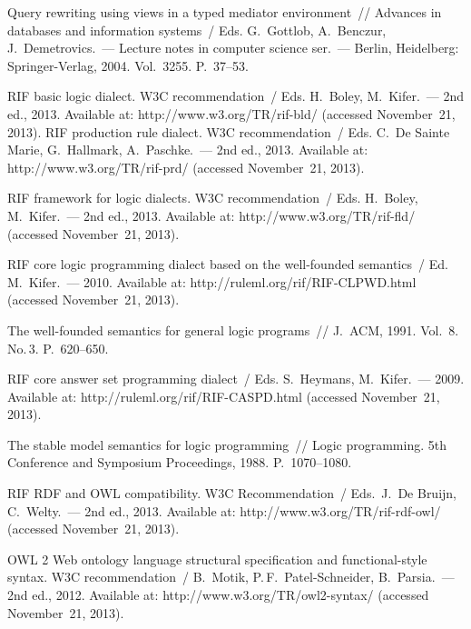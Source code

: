 \begin{multicols}{2}
{{\begin{thebibliography}{99}
 Query rewriting using views
in a typed mediator environment~// {Advances in databases and information
systems}~/ Eds. G.~Gottlob, A.~Benczur, J.~Demetrovics.~--- Lecture notes in
computer science ser.~--- Berlin, Heidelberg: Springer-Verlag, 2004. Vol.~3255.
P.~37--53.

RIF basic logic dialect. W3C recommendation~/
Eds. H.~Boley, M.~Kifer.~--- 2nd ed., 2013.  Available at: {\sf http://www.w3.org/TR/rif-bld/}
(accessed November~21, 2013).
RIF production rule dialect. W3C recommendation~/
Eds. C.~De Sainte Marie, G.~Hallmark, A.~Paschke.~--- 2nd ed., 2013. Available at: {\sf
http://www.w3.org/TR/rif-prd/} (accessed November~21, 2013).

RIF framework for logic dialects. W3C recommendation~/
Eds. H.~Boley,  M.~Kifer.~--- 2nd ed., 2013. Available at: {\sf http://www.w3.org/TR/rif-fld/}
(accessed November~21, 2013).

RIF core logic programming dialect based on the well-founded semantics~/
Ed. M.~Kifer.~--- 2010. Available at: {\sf http://ruleml.org/rif/RIF-CLPWD.html}
(accessed November~21, 2013).

 The well-founded semantics for general
logic programs~// J.~ACM, 1991. Vol.~8. No.\,3. P.~620--650.

RIF core answer set programming dialect~/
Eds. S.~Heymans, M.~Kifer.~--- 2009. Available at: {\sf
http://ruleml.org/rif/RIF-CASPD.html} (accessed November~21, 2013).



 The stable model semantics for logic programming~// Logic
programming. 5th Conference and Symposium Proceedings, 1988. P.~1070--1080.

RIF RDF and OWL compatibility. W3C Recommendation~/
Eds.\ J.~De Bruijn, C.~Welty.~--- 2nd ed., 2013. Available at: {\sf
http://www.w3.org/TR/rif-rdf-owl/} (accessed November~21, 2013).

OWL 2 Web ontology language structural specification and functional-style syntax.  W3C 
recommendation~/ B.~Motik, P.\,F.~Patel-Schneider, B.~Parsia.~--- 2nd ed., 2012. Available at: {\sf
http://www.w3.org/TR/owl2-syntax/} (accessed November~21, 2013).




\end{thebibliography}}}
\end{multicols}
